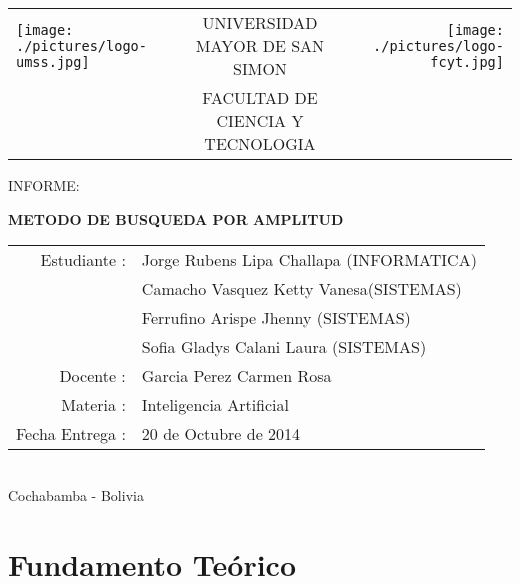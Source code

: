 \documentclass[letterpaper,12pt]{article}
\begin{document}
	\begin{titlepage}
		\begin{center}
		\vspace*{-1in}
		\begin{center}
			\begin{tabular}{lcr}
				\texttt{[image: ./pictures/logo-umss.jpg]} &
				UNIVERSIDAD MAYOR DE SAN SIMON	  & 
				\texttt{[image: ./pictures/logo-fcyt.jpg]} \\
				& FACULTAD DE CIENCIA Y TECNOLOGIA &  \\ 
			\end{tabular}
		\end{center}
	\vspace*{1.6in}
		\begin{large}
			INFORME:\\
		\end{large}
		\vspace*{0.2in}
		\begin{LARGE}
			\textbf{METODO DE BUSQUEDA POR AMPLITUD} \\
		\end{LARGE}
		\vspace*{2in}
		\begin{large}
			\begin{tabular}{rl}
				Estudiante : & Jorge Rubens Lipa Challapa (INFORMATICA) \\
				 & Camacho Vasquez Ketty Vanesa(SISTEMAS) \\ 
				 & Ferrufino Arispe Jhenny (SISTEMAS) \\ 
				 & Sofia Gladys Calani Laura  (SISTEMAS) \\ 
				Docente : & Garcia Perez Carmen Rosa \\ 
				Materia : & Inteligencia Artificial \\
				Fecha Entrega : & 20 de Octubre de 2014\\
			\end{tabular}
		\end{large}
		\vspace*{.5in}\\
		Cochabamba - Bolivia		
	\end{center}
	\end{titlepage}	

\pagebreak
\tableofcontents
\pagebreak

	\section{Fundamento Te\'orico}
\end{document}
